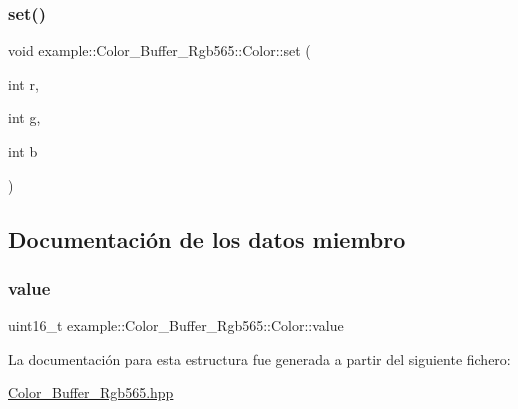 \mbox{\label{structexample_1_1_color___buffer___rgb565_1_1_color_a78ef03cc7c363dd9ab41add324d0054c}} 
\subsubsection{\texorpdfstring{set()}{set()}}
{\footnotesize\ttfamily void example\+::\+Color\+\_\+\+Buffer\+\_\+\+Rgb565\+::\+Color\+::set (\begin{DoxyParamCaption}\item[{int}]{r,  }\item[{int}]{g,  }\item[{int}]{b }\end{DoxyParamCaption})\hspace{0.3cm}{\ttfamily [inline]}}



\subsection{Documentación de los datos miembro}
\mbox{\label{structexample_1_1_color___buffer___rgb565_1_1_color_adca47da57dc30002d9f8f40f292a7fae}} 
\subsubsection{\texorpdfstring{value}{value}}
{\footnotesize\ttfamily uint16\+\_\+t example\+::\+Color\+\_\+\+Buffer\+\_\+\+Rgb565\+::\+Color\+::value}



La documentación para esta estructura fue generada a partir del siguiente fichero\+:\begin{DoxyCompactItemize}
\item 
\mbox{\hyperlink{_color___buffer___rgb565_8hpp}{Color\+\_\+\+Buffer\+\_\+\+Rgb565.\+hpp}}\end{DoxyCompactItemize}

